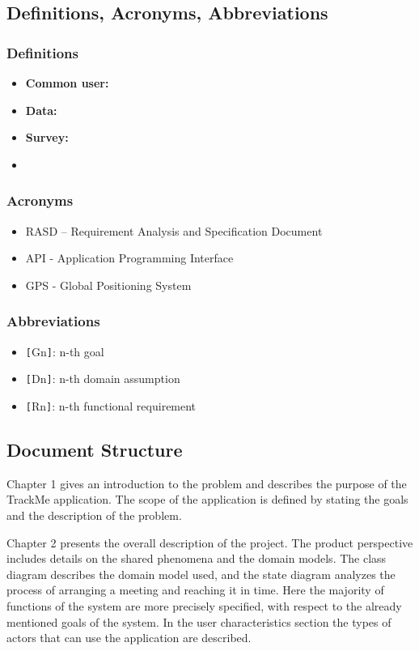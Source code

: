 \subsection{Definitions, Acronyms, Abbreviations}
\subsubsection{Definitions}
\begin{itemize}
\item \textbf{Common user:} 
\item \textbf{Data:}
\item \textbf{Survey:}
\item %
\end{itemize}
\subsubsection{Acronyms}
\begin{itemize}
\item RASD – Requirement Analysis and Specification Document
\item API - Application Programming Interface
\item GPS - Global Positioning System
\end{itemize}
\subsubsection{Abbreviations}
\begin{itemize}
\item \verb|[|Gn\verb|]|: n-th goal
\item \verb|[|Dn\verb|]|: n-th domain assumption
\item \verb|[|Rn\verb|]|: n-th functional requirement
\end{itemize}

\subsection{Document Structure}
Chapter 1 gives an introduction to the problem and describes the purpose of the TrackMe application. The scope of the application is defined by stating the goals and the description of the problem.\newline

Chapter 2 presents the overall description of the project. The product perspective includes details on
the shared phenomena and the domain models. The class diagram describes the domain model used,
and the state diagram analyzes the process of arranging a meeting and reaching it in time. Here the
majority of functions of the system are more precisely specified, with respect to the already mentioned
goals of the system. In the user characteristics section the types of actors that can use the application
are described.\newline

